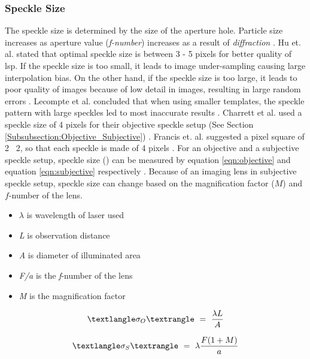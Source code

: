     \subsubsection{Speckle Size}\label{Subsubsection:Speckle_Size}
    The speckle size is determined by the size of the aperture hole. Particle size increases as aperture value (\emph{f-number}) increases as a result of \emph{diffraction} \cite{song}. Hu et. al. stated that optimal speckle size is between 3 - 5 pixels for better quality of \gls{lsp}. If the speckle size is too small, it leads to image under-sampling causing large interpolation bias. On the other hand, if the speckle size is too large, it leads to poor quality of images because of low detail in images, resulting in large random errors \cite{hu}. Lecompte et al. concluded that when using smaller templates, the speckle pattern with large speckles led to most inaccurate results \cite{lecompte}. Charrett et al. used a speckle size of 4 pixels for their objective speckle setup (See Section \ref{Subsubsection:Objective_Subjective}) \cite{charrett_2019}. Francis et. al. suggested a pixel square of 2 \times \ 2, so that each speckle is made of 4 pixels \cite{francis_autonomous}. For an objective and a subjective speckle setup, speckle size (\sigma) can be measured by equation \ref{eqn:objective} and equation \ref{eqn:subjective} respectively \cite{cloud}. Because of an imaging lens in subjective speckle setup, speckle size can change based on the magnification factor ($M$) and $f$-number of the lens. 
    
    \vspace{5mm}
    \begin{itemize}
        \item $\lambda$ is wavelength of laser used
        \item \emph{L} is observation distance
        \item \emph{A} is diameter of illuminated area
        \item \emph{F/a} is the \emph{f}-number of the lens
        \item \emph{M} is the magnification factor
    \end{itemize}

    \begin{equation}\label{eqn:objective}
        \textlangle \sigma_O \textrangle \ = \  \frac{\lambda L}{A}
    \end{equation}

    \begin{equation}\label{eqn:subjective}
        \textlangle \sigma_S \textrangle \ = \  \lambda \frac{F(1 + M)}{a}
    \end{equation}

